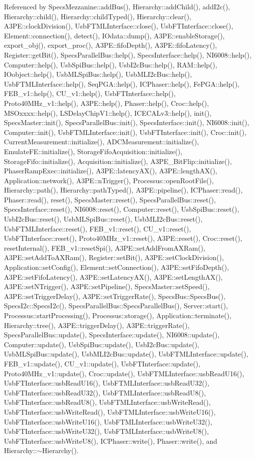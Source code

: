 Referenced by SpecsMezzanine::addBus(), Hierarchy::addChild(), addI2c(), Hierarchy::child(), Hierarchy::childTyped(), Hierarchy::clear(), A3PE::clockDivision(), UsbFTMLInterface::close(), UsbFTInterface::close(), Element::connection(), detect(), IOdata::dump(), A3PE::enableStorage(), export\_\-obj(), export\_\-proc(), A3PE::fifoDepth(), A3PE::fifoLatency(), Register::getBit(), SpecsParallelBus::help(), SpecsInterface::help(), NI6008::help(), Computer::help(), UsbSpiBus::help(), UsbI2cBus::help(), RAM::help(), IOobject::help(), UsbMLSpiBus::help(), UsbMLI2cBus::help(), UsbFTMLInterface::help(), SeqPGA::help(), ICPhaser::help(), FePGA::help(), FEB\_\-v1::help(), CU\_\-v1::help(), UsbFTInterface::help(), Proto40MHz\_\-v1::help(), A3PE::help(), Phaser::help(), Croc::help(), MSOxxxx::help(), LSDelayChipV1::help(), ICECALv3::help(), init(), SpecsMaster::init(), SpecsParallelBus::init(), SpecsInterface::init(), NI6008::init(), Computer::init(), UsbFTMLInterface::init(), UsbFTInterface::init(), Croc::init(), CurrentMeasurement::initialize(), ADCMeasurement::initialize(), EmulateFE::initialize(), StorageFifoAcquisition::initialize(), StorageFifo::initialize(), Acquisition::initialize(), A3PE\_\-BitFlip::initialize(), PhaserRampExec::initialize(), A3PE::latencyAX(), A3PE::lengthAX(), Application::network(), A3PE::nTrigger(), Processus::openRootFile(), Hierarchy::path(), Hierarchy::pathTyped(), A3PE::pipeline(), ICPhaser::read(), Phaser::read(), reset(), SpecsMaster::reset(), SpecsParallelBus::reset(), SpecsInterface::reset(), NI6008::reset(), Computer::reset(), UsbSpiBus::reset(), UsbI2cBus::reset(), UsbMLSpiBus::reset(), UsbMLI2cBus::reset(), UsbFTMLInterface::reset(), FEB\_\-v1::reset(), CU\_\-v1::reset(), UsbFTInterface::reset(), Proto40MHz\_\-v1::reset(), A3PE::reset(), Croc::reset(), resetInternal(), FEB\_\-v1::resetSpi(), A3PE::setAddFromAXRam(), A3PE::setAddToAXRam(), Register::setBit(), A3PE::setClockDivision(), Application::setConfig(), Element::setConnection(), A3PE::setFifoDepth(), A3PE::setFifoLatency(), A3PE::setLatencyAX(), A3PE::setLengthAX(), A3PE::setNTrigger(), A3PE::setPipeline(), SpecsMaster::setSpeed(), A3PE::setTriggerDelay(), A3PE::setTriggerRate(), SpecsBus::SpecsBus(), SpecsI2c::SpecsI2c(), SpecsParallelBus::SpecsParallelBus(), Server::start(), Processus::startProcessing(), Processus::storage(), Application::terminate(), Hierarchy::tree(), A3PE::triggerDelay(), A3PE::triggerRate(), SpecsParallelBus::update(), SpecsInterface::update(), NI6008::update(), Computer::update(), UsbSpiBus::update(), UsbI2cBus::update(), UsbMLSpiBus::update(), UsbMLI2cBus::update(), UsbFTMLInterface::update(), FEB\_\-v1::update(), CU\_\-v1::update(), UsbFTInterface::update(), Proto40MHz\_\-v1::update(), Croc::update(), UsbFTMLInterface::usbReadU16(), UsbFTInterface::usbReadU16(), UsbFTMLInterface::usbReadU32(), UsbFTInterface::usbReadU32(), UsbFTMLInterface::usbReadU8(), UsbFTInterface::usbReadU8(), UsbFTMLInterface::usbWriteRead(), UsbFTInterface::usbWriteRead(), UsbFTMLInterface::usbWriteU16(), UsbFTInterface::usbWriteU16(), UsbFTMLInterface::usbWriteU32(), UsbFTInterface::usbWriteU32(), UsbFTMLInterface::usbWriteU8(), UsbFTInterface::usbWriteU8(), ICPhaser::write(), Phaser::write(), and Hierarchy::$\sim$Hierarchy().


